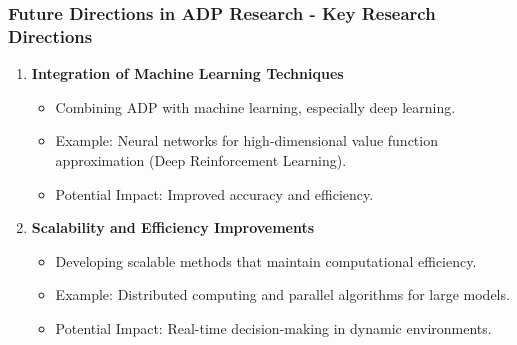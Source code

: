 \documentclass[aspectratio=169]{beamer}
\begin{document}
\begin{frame}[fragile]
    \frametitle{Future Directions in ADP Research - Key Research Directions}
    \begin{enumerate}
        \item \textbf{Integration of Machine Learning Techniques}
            \begin{itemize}
                \item Combining ADP with machine learning, especially deep learning.
                \item Example: Neural networks for high-dimensional value function approximation (Deep Reinforcement Learning). 
                \item Potential Impact: Improved accuracy and efficiency.
            \end{itemize}
            
        \item \textbf{Scalability and Efficiency Improvements}
            \begin{itemize}
                \item Developing scalable methods that maintain computational efficiency.
                \item Example: Distributed computing and parallel algorithms for large models.
                \item Potential Impact: Real-time decision-making in dynamic environments.
            \end{itemize}
    \end{enumerate}
\end{frame}
\end{document}
